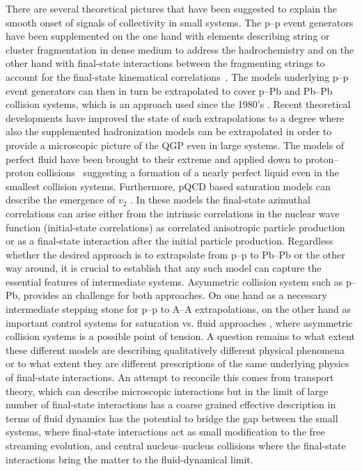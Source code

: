 \documentclass[../report.tex]{subfiles}
\begin{document}
There are several theoretical pictures that have been suggested to explain the smooth onset of signals of collectivity in small systems. The p--p event generators have been supplemented on the one hand with elements describing string or cluster fragmentation in dense medium \cite{Bierlich:2014xba,Gieseke:2017clv} to address the hadrochemistry and on the other hand with final-state interactions between the fragmenting strings to account for the final-state kinematical correlations~\cite{Bierlich:2017vhg}. The models underlying p--p event generators can then in turn be extrapolated to cover p--Pb and Pb--Pb collision systems, which is an approach used since the 1980's \cite{Andersson:1986gw,Wang:1991hta}. Recent theoretical developments \cite{Bierlich:2018xfw,Bellm:2018sjt} have improved the state of such extrapolations to a degree where also the supplemented hadronization models can be extrapolated in order to provide a microscopic picture of the QGP even in large systems.
The models of perfect fluid have been brought to their extreme and applied down to proton--proton collisions~\cite{Werner:2007bf,Weller:2017tsr,Aidala:2018mcw} suggesting a formation of a nearly perfect liquid even in the smallest collision systems. Furthermore, pQCD based saturation models can describe the emergence of $v_2$ \cite{Schenke:2016lrs}. In these models the final-state azimuthal correlations can arise either from the intrinsic correlations in the nuclear wave function (initial-state correlations) as correlated anisotropic particle production or as a final-state interaction after the initial particle production.
Regardless whether the desired approach is to extrapolate from p--p to Pb--Pb or the other way around, it is crucial to establish that any such model can capture the essential features of intermediate systems. Asymmetric collision system such as p--Pb, provides an challenge for both approaches. On one hand as a necessary intermediate stepping stone for p--p to A--A extrapolations, on the other hand as important control systems for saturation vs. fluid approaches \cite{Mace:2018vqw,Nagle:2018ybc}, where asymmetric collision systems is a possible point of tension.
A question remains to what extent these different models are describing qualitatively different physical phenomena or to what extent they are different prescriptions of the same underlying physics of final-state interactions. An attempt to reconcile this comes from transport theory, which can describe microscopic interactions but in the limit of large number of final-state interactions has a coarse grained effective description in terms of fluid dynamics has the potential to bridge the gap between the small systems, where final-state interactions act as small modification to the free streaming evolution, and central nucleus--nucleus collisions where the final-state interactions bring the matter to the fluid-dynamical limit. 
\end{document}

